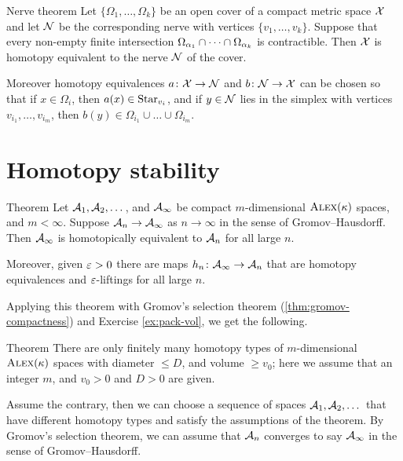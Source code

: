 \begin{thm}{Nerve theorem}\label{thm:nerve}
Let $\{\Omega_1,\dots,\Omega_k\}$ be an open cover of a compact metric space $\mathcal{X}$
and let $\mathcal{N}$ be the corresponding nerve with vertices $\{v_1,\dots,v_k\}$.
Suppose that every non-empty finite intersection $\Omega_{\alpha_1}\cap\dots\cap\Omega_{\alpha_k}$ is contractible.
Then $\mathcal{X}$ is homotopy equivalent to the nerve $\mathcal{N}$ of the cover.

Moreover homotopy equivalences  $a\colon\mathcal{X}\to \mathcal{N}$ and $b\colon\mathcal{N}\to\mathcal{X}$ can be chosen so that 
if $x\in \Omega_i$, then $a(x)\in \mathop{\rm Star}\nolimits_{v_i}$,
and if $y\in\mathcal{N}$ lies in the simplex with vertices $v_{i_1},\dots, v_{i_m}$, then $b(y)\in \Omega_{i_1}\cup\dots\cup \Omega_{i_m}$.
\end{thm}




\section{Homotopy stability}

\begin{thm}{Theorem}\label{thm:h-stability}
Let $\mathcal{A}_1,\mathcal{A}_2,\dots$, and $\mathcal{A}_\infty$ be compact $m$-dimensional $\textsc{Alex}(\kappa)$ spaces, and $m<\infty$.
Suppose $\mathcal{A}_n\to \mathcal{A}_\infty$ as $n\to \infty$ in the sense of Gromov--Hausdorff.
Then $\mathcal{A}_\infty$ is homotopically equivalent to $\mathcal{A}_n$ for all large $n$.

Moreover, given $\varepsilon>0$ there are maps $h_n\colon\mathcal{A}_\infty\to \mathcal{A}_n$ that are homotopy equivalences and $\varepsilon$-liftings for all large $n$.
\end{thm}

Applying this theorem with Gromov's selection theorem (\ref{thm:gromov-compactness}) and Exercise \ref{ex:pack-vol}, we get the following.


\begin{thm}{Theorem}\label{thm:h-finiteness}
There are only finitely many homotopy types of $m$-dimensional $\textsc{Alex}(\kappa)$ spaces with diameter $\le D$, and volume $\ge v_0$;
here we assume that an integer $m$, and $v_0>0$ and $D>0$ are given.
\end{thm}

Assume the contrary, then we can choose a sequence of spaces $\mathcal{A}_1,\mathcal{A}_2,\dots$ that have different homotopy types and satisfy the assumptions of the theorem.
By Gromov's selection theorem, we can assume that $\mathcal{A}_n$ converges to say $\mathcal{A}_\infty$ in the sense of Gromov--Hausdorff.

